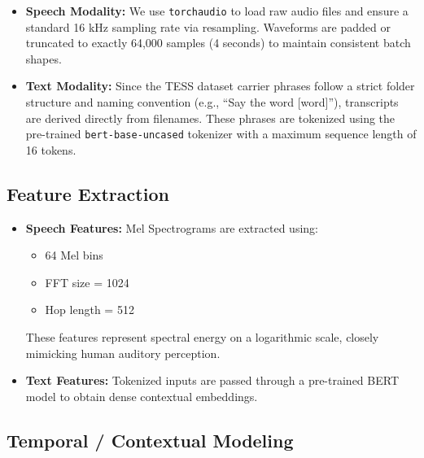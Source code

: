 \documentclass[11pt,journal,onecolumn]{IEEEtran}
\begin{document}
\begin{itemize}
    \item \textbf{Speech Modality:}
    We use \texttt{torchaudio} to load raw audio files and ensure a standard 16 kHz sampling rate via resampling. Waveforms are padded or truncated to exactly 64,000 samples (4 seconds) to maintain consistent batch shapes.
    
    \item \textbf{Text Modality:}
    Since the TESS dataset carrier phrases follow a strict folder structure and naming convention (e.g., ``Say the word [word]''), transcripts are derived directly from filenames. These phrases are tokenized using the pre-trained \texttt{bert-base-uncased} tokenizer with a maximum sequence length of 16 tokens.
\end{itemize}

\subsection{Feature Extraction}

\begin{itemize}
    \item \textbf{Speech Features:}
    Mel Spectrograms are extracted using:
    \begin{itemize}
        \item 64 Mel bins
        \item FFT size = 1024
        \item Hop length = 512
    \end{itemize}
    
    These features represent spectral energy on a logarithmic scale, closely mimicking human auditory perception.

    \item \textbf{Text Features:}
    Tokenized inputs are passed through a pre-trained BERT model to obtain dense contextual embeddings.
\end{itemize}

\subsection{Temporal / Contextual Modeling}
\end{document}
